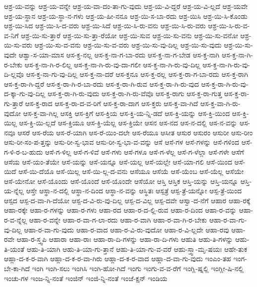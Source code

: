 {ಆಶ್ರ-ಯ-ವನ್ನು
ಆಶ್ರ-ಯ-ವನ್ನೇ
ಆಶ್ರ-ಯ-ವಾ-ದಂ-ತಾ-ಗು-ವುದು
ಆಶ್ರ-ಯ-ವಿ-ದ್ದರೆ
ಆಶ್ರ-ಯ-ವಿ-ಲ್ಲದೆ
ಆಶ್ರ-ಯವೇ
ಆಶ್ರ-ಯ-ಸ್ಥಾನ
ಆಶ್ರ-ಯ-ಸ್ಥಾ-ನ-ಗಳು
ಆಶ್ರ-ಯ-ಹೀ-ನನೂ
ಆಶ್ರ-ಯಿ-ಸ-ಬಾ-ರದು
ಆಶ್ರ-ಯಿಸಿ
ಆಶ್ರ-ಯಿ-ಸಿ-ಕೊಂಡು
ಆಶ್ರ-ಯಿ-ಸಿದ
ಆಶ್ರ-ಯಿ-ಸಿ-ದ-ವರು
ಆಶ್ರ-ಯಿ-ಸಿದೆ
ಆಶ್ರ-ಯಿ-ಸಿ-ರು-ವನು
ಆಶ್ರ-ಯಿ-ಸಿ-ರು-ವರು
ಆಶ್ರ-ಯಿ-ಸಿ-ರು-ವ-ವ-ನಿಗೆ
ಆಶ್ರ-ಯಿ-ಸು-ತ್ತಾರೆ
ಆಶ್ರ-ಯಿ-ಸು-ತ್ತಾ-ರೆಯೋ
ಆಶ್ರ-ಯಿ-ಸುವ
ಆಶ್ರ-ಯಿ-ಸು-ವನು
ಆಶ್ರ-ಯಿ-ಸು-ವನೋ
ಆಶ್ರ-ಯಿ-ಸು-ವರು
ಆಶ್ರ-ಯಿ-ಸು-ವ-ವನು
ಆಶ್ರ-ಯಿ-ಸು-ವ-ವರು
ಆಶ್ರ-ಯಿ-ಸು-ವು-ದಿಲ್ಲ
ಆಶ್ರ-ಯಿ-ಸು-ವುದು
ಆಶ್ರ-ಯಿ-ಸು-ವುದೇ
ಆಶ್ವಾ-ಸ-ಯಾ-ಮಾಸ
ಆಸ-ಕ್ತ-ನಲ್ಲ
ಆಸ-ಕ್ತ-ನಾ-ಗ-ಬಾ-ರದು
ಆಸ-ಕ್ತ-ನಾ-ಗ-ಬೇಡ
ಆಸ-ಕ್ತ-ನಾಗಿ
ಆಸ-ಕ್ತ-ನಾ-ಗಿ-ರ-ಬೇಕು
ಆಸ-ಕ್ತ-ನಾ-ಗಿ-ರ-ಲಿಲ್ಲ
ಆಸ-ಕ್ತ-ನಾ-ಗಿ-ರು-ವು-ದಾ-ಗಲೀ
ಆಸ-ಕ್ತ-ನಾ-ಗಿ-ರು-ವು-ದಿಲ್ಲ
ಆಸ-ಕ್ತ-ನಾ-ಗಿ-ರು-ವು-ದಿ-ಲ್ಲವೊ
ಆಸ-ಕ್ತ-ನಾ-ಗು-ವು-ದಿಲ್ಲ
ಆಸ-ಕ್ತ-ನಾ-ದರೆ
ಆಸ-ಕ್ತನೂ
ಆಸ-ಕ್ತ-ರಲ್ಲ
ಆಸ-ಕ್ತ-ರಾ-ಗ-ಬಾ-ರದು
ಆಸ-ಕ್ತ-ರಾಗಿ
ಆಸ-ಕ್ತ-ರಾ-ಗಿ-ದ್ದರೆ
ಆಸ-ಕ್ತ-ರಾ-ಗಿ-ರ-ಬಾ-ರದು
ಆಸ-ಕ್ತ-ರಾ-ಗಿ-ರುವ
ಆಸ-ಕ್ತ-ರಾ-ಗಿ-ರು-ವುದ
ಆಸ-ಕ್ತ-ರಾ-ಗಿ-ರು-ವು-ದ-ಕ್ಕಾ-ಗು-ವು-ದಿಲ್ಲ
ಆಸ-ಕ್ತ-ರಾ-ಗಿ-ರು-ವುದು
ಆಸ-ಕ್ತ-ರಾ-ಗಿ-ರು-ವೆವೊ
ಆಸ-ಕ್ತ-ರಾಗು
ಆಸ-ಕ್ತ-ರಾ-ಗುತ್ತ
ಆಸ-ಕ್ತ-ರಾ-ಗು-ತ್ತಾರೆ
ಆಸ-ಕ್ತ-ರಾದ
ಆಸ-ಕ್ತ-ರಾ-ದ-ವ-ರಿಗೆ
ಆಸ-ಕ್ತ-ರಾ-ದಾಗ
ಆಸ-ಕ್ತರು
ಆಸ-ಕ್ತ-ವಾ-ಗಿದೆ
ಆಸ-ಕ್ತ-ವಾ-ಗಿ-ರು-ವುದೋ
ಆಸ-ಕ್ತ-ವಾ-ಗಿಲ್ಲ
ಆಸಕ್ತಿ
ಆಸ-ಕ್ತಿಗೆ
ಆಸ-ಕ್ತಿಯ
ಆಸ-ಕ್ತಿ-ಯ-ನ್ನಿ-ಡದೆ
ಆಸ-ಕ್ತಿ-ಯನ್ನು
ಆಸ-ಕ್ತಿ-ಯಿಂದ
ಆಸ-ಕ್ತಿ-ಯಿಲ್ಲ
ಆಸ-ಕ್ತಿ-ಯಿ-ಲ್ಲದೆ
ಆಸ-ಕ್ತಿಯೂ
ಆಸ-ಕ್ತಿ-ಯೆಲ್ಲ
ಆಸ-ಕ್ತಿಯೇ
ಆಸನ
ಆಸ-ನದ
ಆಸ-ನ-ದಲ್ಲಿ
ಆಸ-ನ-ವನ್ನು
ಆಸ-ನವೂ
ಆಸರೆ
ಆಸ-ರೆಯ
ಆಸ-ರೆ-ಯಾಗಿ
ಆಸ-ರೆ-ಯಿಂ-ದಲೇ
ಆಸ-ರೆಯೂ
ಆಸೀತ
ಆಸುರ
ಆಸುರಂ
ಆಸುರೀ
ಆಸು-ರೀಂ
ಆಸು-ರೀ-ಸಂ-ಪ-ತ್ತನ್ನು
ಆಸು-ರೀ-ಸ್ವ-ಭಾವ
ಆಸು-ರೀ-ಸ್ವ-ಭಾ-ವ-ವನ್ನು
ಆಸೆ
ಆಸೆ-ಗಳ
ಆಸೆ-ಗಳನ್ನು
ಆಸೆ-ಗಳಿಂದ
ಆಸೆ-ಗ-ಳಿ-ರ-ಬ-ಹುದು
ಆಸೆ-ಗ-ಳಿಲ್ಲ
ಆಸೆ-ಗ-ಳಿವೆ
ಆಸೆ-ಗಳು
ಆಸೆ-ಗಳೂ
ಆಸೆ-ಗ-ಳೆಲ್ಲ
ಆಸೆ-ಗ-ಳೆಲ್ಲಾ
ಆಸೆ-ಗಳೇ
ಆಸೆಗೆ
ಆಸೆಯ
ಆಸೆ-ಯಂ-ತೆಯೇ
ಆಸೆ-ಯನ್ನು
ಆಸೆ-ಯನ್ನೂ
ಆಸೆ-ಯಲ್ಲ
ಆಸೆ-ಯಲ್ಲೇ
ಆಸೆ-ಯಾ-ಗಲಿ
ಆಸೆ-ಯಿಂದ
ಆಸೆ-ಯಿದೆ
ಆಸೆ-ಯಿ-ದೆಯೊ
ಆಸೆ-ಯಿಲ್ಲ
ಆಸೆ-ಯಿ-ಲ್ಲ-ದ-ವನು
ಆಸೆಯೂ
ಆಸೆಯೆ
ಆಸೆ-ಯೆಂಬ
ಆಸೆ-ಯೆಲ್ಲ
ಆಸೆಯೇ
ಆಸೆ-ಯೇನೋ
ಆಸೆ-ಯೊಂದು
ಆಸೆ-ಯೊಂದೆ
ಆಸೆ-ಯೊಂದೇ
ಆಸೆಯೋ
ಆಸ್ತಿ
ಆಸ್ತಿಕ
ಆಸ್ತಿ-ಯನ್ನು
ಆಸ್ತಿ-ಯನ್ನೂ
ಆಸ್ತಿ-ಯ-ನ್ನೆಲ್ಲ
ಆಸ್ತೇ
ಆಸ್ಥಾ-ನ-ದಲ್ಲಿ
ಆಸ್ಥಾ-ನ-ದಿಂದ
ಆಸ್ಥಾ-ನ-ವನ್ನು
ಆಸ್ಥಿತಃ
ಆಸ್ಪತ್ರೆ
ಆಸ್ಪ-ತ್ರೆ-ಯನ್ನೋ
ಆಸ್ಪ-ತ್ರೆ-ಯಿಂದ
ಆಸ್ಪದ
ಆಸ್ಪ-ದ-ವಾ-ಗಿ-ದೆಯೋ
ಆಸ್ಪ-ದ-ವಿ-ರು-ವು-ದಿಲ್ಲ
ಆಸ್ಪ-ದ-ವಿಲ್ಲ
ಆಸ್ಪ-ದವೇ
ಆಸ್ವಾ-ದ-ನೆಗೆ
ಆಹಾರ
ಆಹಾ-ರಕ್ಕೆ
ಆಹಾ-ರಕ್ಕೇ
ಆಹಾ-ರ-ಗಳನ್ನು
ಆಹಾ-ರ-ಗಳು
ಆಹಾ-ರದ
ಆಹಾ-ರ-ದ-ಲ್ಲಿ-ರುವ
ಆಹಾ-ರ-ದಿಂದ
ಆಹಾ-ರ-ವನ್ನು
ಆಹಾ-ರ-ವ-ನ್ನೆಲ್ಲ
ಆಹಾ-ರ-ವನ್ನೇ
ಆಹಾ-ರ-ವಾ-ಗ-ಲಾ-ರದು
ಆಹಾ-ರ-ವಾಗಿ
ಆಹಾ-ರ-ವಾ-ಗಿ-ರ-ಬೇಕು
ಆಹಾ-ರ-ವಾ-ಗು-ವು-ದಿಲ್ಲ
ಆಹಾ-ರ-ವಾ-ಗು-ವುದು
ಆಹಾ-ರ-ವಾದ
ಆಹಾ-ರ-ವಿ-ರು-ವುದೋ
ಆಹಾ-ರ-ವಿ-ಲ್ಲದೇ
ಆಹಾ-ರವು
ಆಹಾ-ರವೇ
ಆಹಾ-ರ-ಸ್ತ್ವಪಿ
ಆಹಾರಾ
ಆಹಾ-ರಾಃ
ಆಹಾ-ರಾ-ದಿ-ಗಳನ್ನು
ಆಹಾ-ರಾ-ದಿ-ಗಳು
ಆಹುತಿ
ಆಹು-ತಿ-ಗಳನ್ನು
ಆಹು-ತಿ-ಯಂತೆ
ಆಹು-ತಿ-ಯಾಗಿ
ಆಹು-ತಿ-ಯಾ-ಗು-ತ್ತಾನೆ
ಆಹು-ತಿ-ಯಾ-ಗು-ವ-ವರೆ
ಆಹು-ಸ್ತ್ವಾ-ಮೃ-ಷಯಃ
ಆಹೇ-ತುಕ
ಆಹ್ಲಾ-ದ-ಕ-ರ-ವಾಗಿ
ಆಹ್ಲಾ-ದ-ಕ-ರ-ವಾ-ಗಿರು
ಆಹ್ಲಾ-ದ-ಕ-ರ-ವಾದ
ಆಹ್ಲಾ-ದ-ವಾ-ಗು-ವುದು
ಇಂಎಂ-ತಹ
ಇಂಗ-ಬೇ-ಕಾ-ಗಿದೆ
ಇಂಗಿ
ಇಂಗಿ-ಸಲು
ಇಂಗಿಸಿ
ಇಂಗಿ-ಹೋ-ಗಿದೆ
ಇಂಗು
ಇಂಗು-ವ-ವ-ರೆಗೆ
ಇಂಗ್ಲಿ-ಷ್ನಲ್ಲಿ
ಇಂಗ್ಲೀ-ಷಿ-ನಲ್ಲಿ
ಇಂಚು-ಗಳ
ಇಂಜ-ನ್ನಿ-ನಂತೆ
ಇಂಜಿನ್
ಇಂಜಿ-ನ್ನಿ-ನಂತೆ
ಇಂಜೆ-ಕ್ಷನ್
ಇಂಡಿಯ
}
